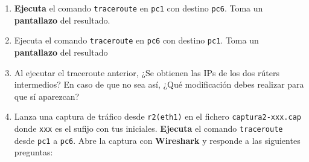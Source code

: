 \documentclass[a4paper]{article}
\begin{document}
\begin{enumerate}
    \item \textbf{Ejecuta} el comando \texttt{traceroute} en \texttt{pc1} con destino \texttt{pc6}. Toma un \textbf{pantallazo} del resultado.
    
    \item Ejecuta el comando \texttt{traceroute} en \texttt{pc6} con destino \texttt{pc1}. Toma un \textbf{pantallazo} del resultado
    
    \item Al ejecutar el traceroute anterior, ¿Se obtienen las IPs de los dos rúters intermedios? En caso de que no sea así, ¿Qué modificación debes realizar para que sí aparezcan?
    
    \item Lanza una captura de tráfico desde \texttt{r2(eth1)} en el fichero \texttt{captura2-xxx.cap} 
    donde \texttt{xxx} es el  
    sufijo con tus iniciales. \textbf{Ejecuta} el comando \texttt{traceroute} desde \texttt{pc1} a \texttt{pc6}. Abre la captura con  
    \textbf{Wireshark} y responde a las siguientes preguntas:

\end{enumerate}





  
%
%
\end{document}
